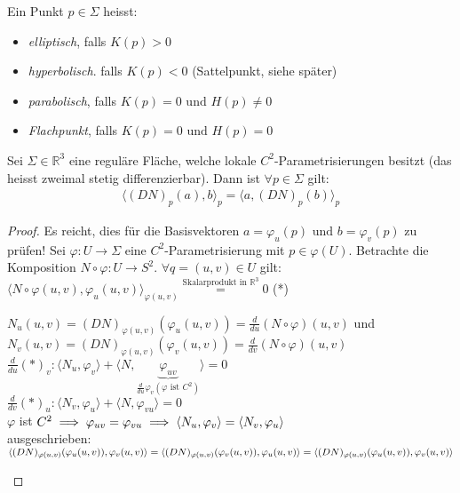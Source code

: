 \documentclass[../main.tex]{subfiles}
\begin{document}
\begin{notation}
    Ein Punkt $p\in \Sigma$ heisst:
    \begin{itemize}
        \item \emph{elliptisch}, falls $K(p) > 0$
        \item \emph{hyperbolisch}. falls $K(p) < 0$ (Sattelpunkt, siehe später)
        \item \emph{parabolisch}, falls $K(p) = 0 \text{ und } H(p) \neq 0$
        \item \emph{Flachpunkt}, falls $K(p) = 0 \text{ und } H(p) = 0$
    \end{itemize}
\end{notation}
\begin{proposition}
    Sei $\Sigma \in \mathbb{R}^{3}$ eine reguläre Fläche, welche lokale $C^{2}$-Parametrisierungen besitzt (das heisst zweimal stetig differenzierbar). 
    Dann ist $\forall p \in \Sigma$ gilt:
    \begin{align*}
        \langle (DN)_{p}(a), b\rangle_{p} = \langle a, (DN)_{p}(b)\rangle_{p}
    \end{align*}
\end{proposition}
\begin{proof}
    Es reicht, dies für die Basisvektoren $a = \varphi_{u}(p) \text{ und } b = \varphi_{v}(p)$ zu prüfen!
    Sei $\varphi : U \to \Sigma$ eine $C^{2}$-Parametrisierung mit $p\in\varphi(U)$.
    Betrachte die Komposition $N \circ \varphi : U \to S^{2}$.
    $\forall q = (u,v)\in U$ gilt: $\langle N\circ \varphi(u,v), \varphi_{u}(u,v)\rangle_{\varphi(u,v)} \stackrel{\text{Skalarprodukt in }\mathbb{R}^{3}}{=} 0$ (*)
    \begin{notation}
        $N_{u}(u,v) = (DN)_{\varphi(u,v)}(\varphi_{u}(u,v)) = \frac{d}{du}(N\circ\varphi)(u,v)$ und \\
        $N_{v}(u,v) = (DN)_{\varphi(u,v)}(\varphi_{v}(u,v)) = \frac{d}{dv}(N\circ\varphi)(u,v)$ \\
        $\frac{d}{du}(*)_{v} : \langle N_{u}, \varphi_{v} \rangle + \langle N, \underbrace{\varphi_{uv}}_{\frac{d}{du}\varphi_{v}(\varphi \text{ ist } C^{2})}\rangle = 0$\\
        $\frac{d}{dv} (*)_{u} : \langle N_{v}, \varphi_{u} \rangle + \langle N, \varphi_{vu} \rangle = 0$\\
        $\varphi$ ist $C^{2} \implies \varphi_{uv} = \varphi_{vu}\\
        \implies \langle N_{u}, \varphi_{v}\rangle = \langle N_{v}, \varphi_{u}\rangle$ \\ausgeschrieben: $\langle (DN)_{\varphi(u,v)}(\varphi_{u}(u,v)), \varphi_{v}(u,v)\rangle = \langle (DN)_{\varphi(u,v)}(\varphi_{v}(u,v)), \varphi_{u}(u,v)\rangle \\= \langle (DN)_{\varphi(u,v)}(\varphi_{u}(u,v)), \varphi_{v}(u,v)\rangle$
    \end{notation}
\end{proof}
\end{document}
